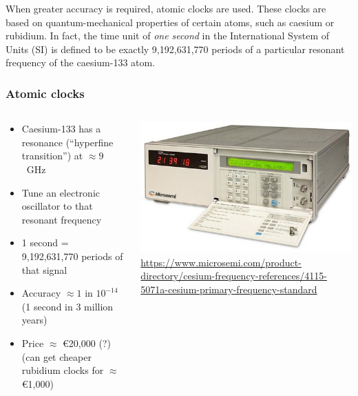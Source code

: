 When greater accuracy is required, atomic clocks are used.
These clocks are based on quantum-mechanical properties of certain atoms, such as caesium or rubidium.
In fact, the time unit of \emph{one second} in the International System of Units (SI) is defined to be exactly 9,192,631,770 periods of a particular resonant frequency of the caesium-133 atom.

\begin{frame}
    \label{s:atomic-clocks}
    \frametitle{Atomic clocks}
    \begin{columns}
        \begin{column}{0.5\textwidth}
            \begin{itemize}
                \item Caesium-133 has a resonance (``hyperfine transition'') at $\approx 9$~GHz
                \item Tune an electronic oscillator to that resonant frequency
                \item 1 second = 9,192,631,770 periods of that signal
                \item Accuracy $\approx 1 \text{ in } 10^{-14}$ (1 second in 3 million years)
                \item Price $\approx$ {\euro}20,000 (?)\\ (can get cheaper rubidium clocks for $\approx$ {\euro}1,000)
            \end{itemize}
        \end{column}
        \begin{column}{0.5\textwidth}
            \includegraphics[width=\textwidth]{images/atomic-clock.jpg}\\[1em]
            \scriptsize\url{https://www.microsemi.com/product-directory/cesium-frequency-references/4115-5071a-cesium-primary-frequency-standard}
        \end{column}
    \end{columns}
\end{frame}
\label{l:atomic-clocks}


